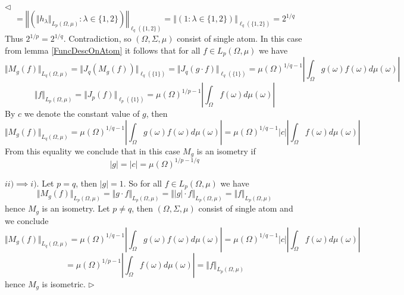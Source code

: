 \documentclass[12pt]{article}
\newenvironment{proof}{\par $\triangleleft$}{$\triangleright$}
\begin{document}
\begin{proof}
$$$$
$$
=\left\Vert\left(\Vert h_\lambda\Vert_{L_p(\Omega,\mu)}:\lambda\in\{1,2\}\right)\right\Vert_{\ell_q(\{1,2\})}
=\left\Vert\left(1:\lambda\in\{1,2\}\right)\right\Vert_{\ell_q(\{1,2\})}
=2^{1/q}
$$
Thus $2^{1/p}=2^{1/q}$. Contradiction, so $(\Omega,\Sigma,\mu)$ consist of single atom. In this case from lemma \ref{FuncDescOnAtom} it follows that for all $f\in L_p(\Omega,\mu)$ we have
$$
\Vert M_g(f)\Vert_{L_q(\Omega,\mu)}
=\Vert J_q(M_g(f))\Vert_{\ell_q(\{1\})}
=\Vert J_q(g\cdot f)\Vert_{\ell_q(\{1\})}
=\mu(\Omega)^{1/q-1}\left|\int_\Omega g(\omega) f(\omega)d\mu(\omega)\right|
$$
$$
\Vert f\Vert_{L_p(\Omega,\mu)}
=\Vert J_p(f)\Vert_{\ell_p(\{1\})}
=\mu(\Omega)^{1/p-1}\left|\int_\Omega f(\omega)d\mu(\omega)\right|
$$
By $c$ we denote the constant value of $g$, then
$$
\Vert M_g(f)\Vert_{L_q(\Omega,\mu)}
=\mu(\Omega)^{1/q-1}\left|\int_\Omega g(\omega) f(\omega)d\mu(\omega)\right|
=\mu(\Omega)^{1/q-1}|c|\left|\int_\Omega f(\omega)d\mu(\omega)\right|
$$
From this equality we conclude that in this case $M_g$ is an isometry if
$$
|g|=|c|=\mu(\Omega)^{1/p-1/q}
$$

$ii)\implies i)$. Let $p=q$, then $|g|=1$. So for all $f\in L_p(\Omega,\mu)$ we have
$$
\Vert M_g(f)\Vert_{L_p(\Omega,\mu)}
=\Vert g\cdot f\Vert_{L_p(\Omega,\mu)}
=\Vert |g|\cdot f\Vert_{L_p(\Omega,\mu)}
=\Vert f\Vert_{L_p(\Omega,\mu)}
$$
hence $M_g$ is an isometry. Let $p\neq q$, then $(\Omega,\Sigma,\mu)$ consist of single atom and we conclude
$$
\Vert M_g(f)\Vert_{L_q(\Omega,\mu)}
=\mu(\Omega)^{1/q-1}\left|\int_\Omega g(\omega) f(\omega)d\mu(\omega)\right|
=\mu(\Omega)^{1/q-1}|c|\left|\int_\Omega f(\omega)d\mu(\omega)\right|
$$
$$
=\mu(\Omega)^{1/p-1}\left|\int_\Omega f(\omega)d\mu(\omega)\right|
=\Vert f\Vert_{L_p(\Omega,\mu)}
$$
hence $M_g$ is isometric.
\end{proof}
\end{document}
